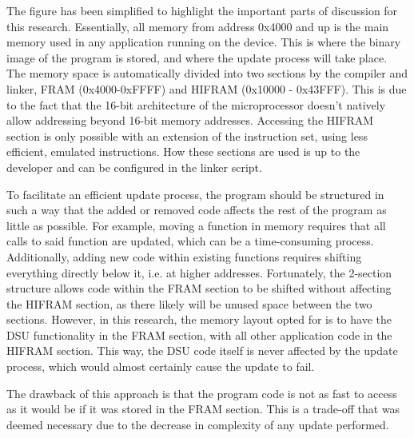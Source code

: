 The figure has been simplified to highlight the important parts of discussion for this research. Essentially, all memory from address 0x4000 and up is the main memory used in any application running on the device. This is where the binary image of the program is stored, and where the update process will take place. The memory space is automatically divided into two sections by the compiler and linker, FRAM (0x4000-0xFFFF) and HIFRAM (0x10000 - 0x43FFF). This is due to the fact that the 16-bit architecture of the microprocessor doesn't natively allow addressing beyond 16-bit memory addresses. Accessing the HIFRAM section is only possible with an extension of the instruction set, using less efficient, emulated instructions. How these sections are used is up to the developer and can be configured in the linker script. 

To facilitate an efficient update process, the program should be structured in such a way that the added or removed code affects the rest of the program as little as possible. For example, moving a function in memory requires that all calls to said function are updated, which can be a time-consuming process. Additionally, adding new code within existing functions requires shifting everything directly below it, i.e. at higher addresses. Fortunately, the 2-section structure allows code within the FRAM section to be shifted without affecting the HIFRAM section, as there likely will be unused space between the two sections. However, in this research, the memory layout opted for is to have the DSU functionality in the FRAM section, with all other application code in the HIFRAM section. This way, the DSU code itself is never affected by the update process, which would almost certainly cause the update to fail. 

The drawback of this approach is that the program code is not as fast to access as it would be if it was stored in the FRAM section. This is a trade-off that was deemed necessary due to the decrease in complexity of any update performed.  
